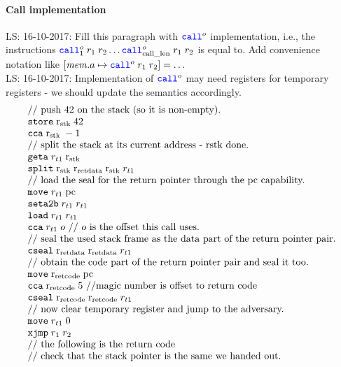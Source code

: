 \documentclass[a3paper]{article}
\newcommand\lau[1]{{\color{purple} \sf \footnotesize {LS: #1}}\\}
\newcommand{\sourcecolor}{\color{blue}}
\newcommand{\src}[1]{{\sourcecolor #1}}
\newcommand{\targetcolor}[1]{\color{black}}
\newcommand{\trg}[1]{{\targetcolor{} #1}}
\newcommand{\zinstr}[1]{\texttt{#1}}
\newcommand{\twoinstr}[3]{
  \ifthenelse{\equal{#2#3}{}}
  {\zinstr{#1}}
  {\zinstr{#1} \; #2 \; #3}
}
\newcommand{\threeinstr}[4]{
  \ifthenelse{\equal{#2#3#4}{}}
  {\zinstr{#1}}
  {\zinstr{#1} \; #2 \; #3 \; #4}
}
\newcommand{\fourinstr}[5]{
  \ifthenelse{\equal{#2#3#4#5}{}}
  {\zinstr{#1}}
  {\zinstr{#1} \; #2 \; #3 \; #4 \; #5}
}
\newcommand{\scall}[4][]{  
\ifthenelse{\equal{#3#4}{}}
  {\ensuremath{\zinstr{\src{call}}_{#1}^{#2}}}
  {\ensuremath{\zinstr{\src{call}}_{#1}^{#2} \; #3 \; #4}}
}
\newcommand{\tgeta}[2]{\twoinstr{\trg{geta}}{#1}{#2}}
\newcommand{\tmove}[2]{\twoinstr{\trg{move}}{#1}{#2}}
\newcommand{\tstore}[2]{\twoinstr{\trg{store}}{#1}{#2}}
\newcommand{\tload}[2]{\twoinstr{\trg{load}}{#1}{#2}}
\newcommand{\tcca}[2]{\twoinstr{\trg{cca}}{#1}{#2}}
\newcommand{\txjmp}[2]{\twoinstr{\trg{xjmp}}{#1}{#2}}
\newcommand{\tsetatob}[2]{\twoinstr{\trg{seta2b}}{#1}{#2}}
\newcommand{\tcseal}[3]{\threeinstr{\trg{cseal}}{#1}{#2}{#3}}
\newcommand{\tsplit}[4]{\fourinstr{\trg{split}}{#1}{#2}{#3}{#4}}
\newcommand{\update}[2]{[#1 \mapsto #2]}
\newcommand{\var}[1]{\mathit{#1}}
\newcommand{\mem}{\var{mem}}
\newcommand{\constant}[1]{\mathrm{#1}}
\newcommand{\calllen}{\constant{call\_len}}
\newcommand{\pcreg}{\mathrm{pc}}
\newcommand{\rstk}{\mathrm{r}_\mathrm{stk}}
\newcommand{\rretc}{\mathrm{r}_\mathrm{ret code}}
\newcommand{\rretd}{\mathrm{r}_\mathrm{ret data}}
\begin{document}
\paragraph{Call implementation}
\label{par:call-impl}
\lau{16-10-2017: Fill this paragraph with $\scall{o}{}{}$ implementation, i.e., the instructions $\scall[1]{o}{r_1}{r_2} \dots \scall[\calllen]{o}{r_1}{r_2}$ is equal to. Add convenience notation like $\update{\mem.a}{\scall{o}{r_1}{r_2}} = \dots$}
\lau{16-10-2017: Implementation of $\scall{o}{}{}$ may need registers for temporary registers - we should update the semantics accordingly.}
\[
  \begin{array}{l}
    \text{// push 42 on the stack (so it is non-empty).}\\
    \tstore{\rstk}{42}\\
    \tcca{\rstk}{-1}\\
    \text{// split the stack at its current address - rstk done.}\\
    \tgeta{r_{t1}}{\rstk}\\
    \tsplit{\rstk}{\rretd}{\rstk}{r_{t1}}\\
    \text{// load the seal for the return pointer through the pc capability.}\\
    \tmove{r_{t1}}{\pcreg}\\
    \tsetatob{r_{t1}}{r_{t1}}\\
    \tload{r_{t1}}{r_{t1}}\\
    \tcca{r_{t1}}{o}\text{ // $o$ is the offset this call uses.}\\
    \text{// seal the used stack frame as the data part of the return pointer pair.}\\
    \tcseal{\rretd}{\rretd}{r_{t1}}\\
    \text{// obtain the code part of the return pointer pair and seal it too.}\\
    \tmove{\rretc}{\pcreg}\\
    \tcca{\rretc}{5} \text{ //magic number is offset to return code}\\
    \tcseal{\rretc}{\rretc}{r_{t1}}\\
    \text{// now clear temporary register and jump to the adversary.}\\
    \tmove{r_{t1}}{0}\\
    \txjmp{r_1}{r_2}\\
    \text{// the following is the return code}\\
    \text{// check that the stack pointer is the same we handed out.}\\

\end{array}\]
\end{document}
